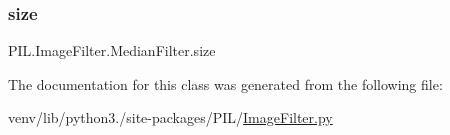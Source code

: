 \subsubsection{\texorpdfstring{size}{size}}
{\footnotesize\ttfamily P\+I\+L.\+Image\+Filter.\+Median\+Filter.\+size}



The documentation for this class was generated from the following file\+:\begin{DoxyCompactItemize}
\item 
venv/lib/python3./site-\/packages/\+P\+I\+L/\hyperlink{ImageFilter_8py}{Image\+Filter.\+py}\end{DoxyCompactItemize}
